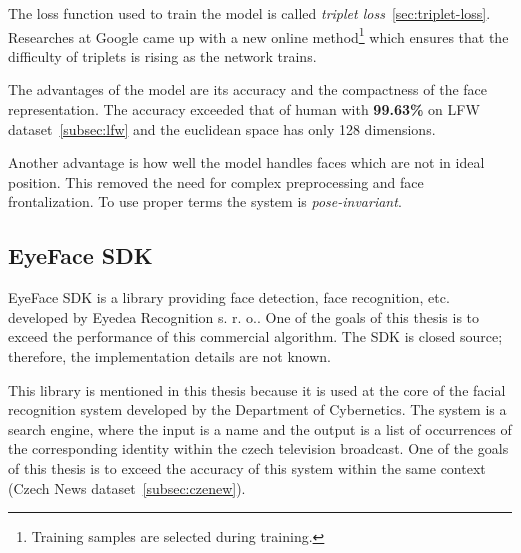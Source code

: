 The loss function used to train the model is called \textit{triplet loss}~\ref{sec:triplet-loss}.
Researches at Google came up with a new online method\footnote{Training samples are selected during training.} which
ensures that the difficulty of triplets is rising as the network trains.

The advantages of the model are its accuracy and the compactness of the face representation.
The accuracy exceeded that of human with \textbf{99.63\%} on LFW dataset~\ref{subsec:lfw} and the euclidean space has
only 128 dimensions.

Another advantage is how well the model handles faces which are not in ideal position.
This removed the need for complex preprocessing and face frontalization.
To use proper terms the system is \textit{pose-invariant}.

\subsection{EyeFace SDK}\label{subsec:eyeface}
EyeFace SDK is a library providing face detection, face recognition, etc. developed by Eyedea Recognition s. r. o..
One of the goals of this thesis is to exceed the performance of this commercial algorithm.
The SDK is closed source; therefore, the implementation details are not known.

This library is mentioned in this thesis because it is used at the core of the facial recognition system developed by
the Department of Cybernetics.
The system is a search engine, where the input is a name and the output is a list of occurrences of
the corresponding identity within the czech television broadcast.
One of the goals of this thesis is to exceed the accuracy of this system within the same context
(Czech News dataset~\ref{subsec:czenew}).